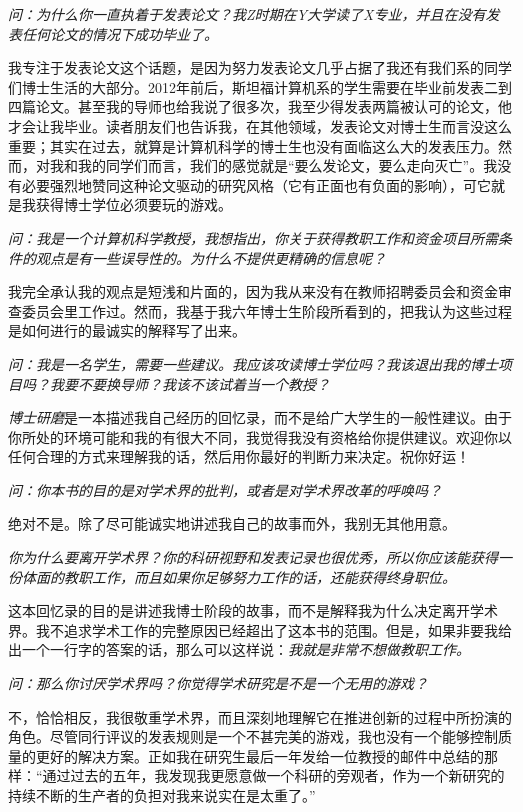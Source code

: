 \documentclass[letter,12pt]{book}
\newcommand{\bookname}{博士研磨}
\begin{document}
\begin{CJK}{UTF8}{gbsn}
\emph{问：为什么你一直执着于发表论文？我Z时期在Y大学读了X专业，并且在没有发表任何论文的情况下成功毕业了。}

我专注于发表论文这个话题，是因为努力发表论文几乎占据了我还有我们系的同学们博士生活的大部分。2012年前后，斯坦福计算机系的学生需要在毕业前发表二到四篇论文。甚至我的导师也给我说了很多次，我至少得发表两篇被认可的论文，他才会让我毕业。读者朋友们也告诉我，在其他领域，发表论文对博士生而言没这么重要；其实在过去，就算是计算机科学的博士生也没有面临这么大的发表压力。然而，对我和我的同学们而言，我们的感觉就是“要么发论文，要么走向灭亡”。我没有必要强烈地赞同这种论文驱动的研究风格（它有正面也有负面的影响），可它就是我获得博士学位必须要玩的游戏。

\emph{问：我是一个计算机科学教授，我想指出，你关于获得教职工作和资金项目所需条件的观点是有一些误导性的。为什么不提供更精确的信息呢？}

我完全承认我的观点是短浅和片面的，因为我从来没有在教师招聘委员会和资金审查委员会里工作过。然而，我基于我六年博士生阶段所看到的，把我认为这些过程是如何进行的最诚实的解释写了出来。

\emph{问：我是一名学生，需要一些建议。我应该攻读博士学位吗？我该退出我的博士项目吗？我要不要换导师？我该不该试着当一个教授？}

\emph{\bookname}是一本描述我自己经历的回忆录，而不是给广大学生的一般性建议。由于你所处的环境可能和我的有很大不同，我觉得我没有资格给你提供建议。欢迎你以任何合理的方式来理解我的话，然后用你最好的判断力来决定。祝你好运！

\emph{问：你本书的目的是对学术界的批判，或者是对学术界改革的呼唤吗？}

绝对不是。除了尽可能诚实地讲述我自己的故事而外，我别无其他用意。

\emph{你为什么要离开学术界？你的科研视野和发表记录也很优秀，所以你应该能获得一份体面的教职工作，而且如果你足够努力工作的话，还能获得终身职位。}

这本回忆录的目的是讲述我博士阶段的故事，而不是解释我为什么决定离开学术界。我不追求学术工作的完整原因已经超出了这本书的范围。但是，如果非要我给出一个一行字的答案的话，那么可以这样说：\emph{我就是非常不想做教职工作。}

\emph{问：那么你讨厌学术界吗？你觉得学术研究是不是一个无用的游戏？}

不，恰恰相反，我很敬重学术界，而且深刻地理解它在推进创新的过程中所扮演的角色。尽管同行评议的发表规则是一个不甚完美的游戏，我也没有一个能够控制质量的更好的解决方案。正如我在研究生最后一年发给一位教授的邮件中总结的那样：“通过过去的五年，我发现我更愿意做一个科研的旁观者，作为一个新研究的持续不断的生产者的负担对我来说实在是太重了。”


\end{CJK}
\end{document}

